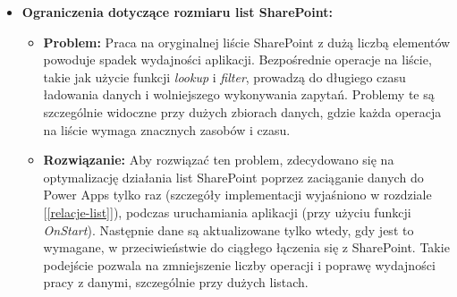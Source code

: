 \begin{itemize}
      \item \textbf{Ograniczenia dotyczące rozmiaru list SharePoint:}
            \begin{itemize}
                  \item \textbf{Problem:} Praca na oryginalnej liście SharePoint z dużą liczbą elementów powoduje spadek wydajności aplikacji. Bezpośrednie operacje na liście, takie jak użycie funkcji \emph{lookup} i \emph{filter}, prowadzą do długiego czasu ładowania danych i wolniejszego wykonywania zapytań. Problemy te są szczególnie widoczne przy dużych zbiorach danych, gdzie każda operacja na liście wymaga znacznych zasobów i czasu.
                  \item \textbf{Rozwiązanie:} Aby rozwiązać ten problem, zdecydowano się na optymalizację działania list SharePoint poprzez zaciąganie danych do Power Apps tylko raz (szczegóły implementacji wyjaśniono w rozdziale [\ref{relacje-list}]), podczas uruchamiania aplikacji (przy użyciu funkcji \emph{OnStart}). Następnie dane są aktualizowane tylko wtedy, gdy jest to wymagane, w przeciwieństwie do ciągłego łączenia się z SharePoint. Takie podejście pozwala na zmniejszenie liczby operacji i poprawę wydajności pracy z danymi, szczególnie przy dużych listach.
            \end{itemize}
\end{itemize}
